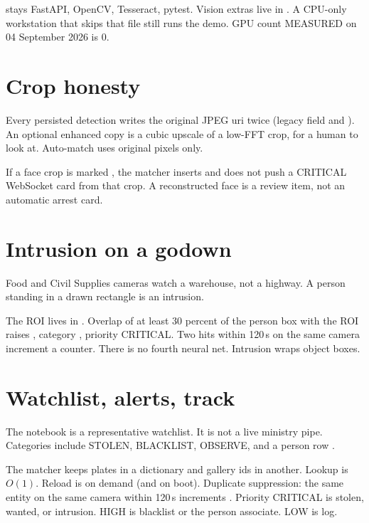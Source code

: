 \documentclass[listings]{csf301-notes}
\begin{document}
\begin{implnote}
 stays FastAPI, OpenCV, Tesseract, pytest. Vision extras live in . A CPU-only workstation that skips that file still runs the demo. GPU count MEASURED on 04 September 2026 is 0.
\end{implnote}

\section{Crop honesty}
Every persisted detection writes the original JPEG uri twice (legacy field and ). An optional enhanced copy is a cubic upscale of a low-FFT crop, for a human to look at. Auto-match uses original pixels only.

If a face crop is marked , the matcher inserts  and does not push a CRITICAL WebSocket card from that crop. A reconstructed face is a review item, not an automatic arrest card.

\section{Intrusion on a godown}
Food and Civil Supplies cameras watch a warehouse, not a highway. A person standing in a drawn rectangle is an intrusion.

The ROI lives in . Overlap of at least 30 percent of the person box with the ROI raises , category , priority CRITICAL. Two hits within 120\,s on the same camera increment a counter. There is no fourth neural net. Intrusion wraps object boxes.

\section{Watchlist, alerts, track}
The notebook is a representative watchlist. It is not a live ministry pipe. Categories include STOLEN, BLACKLIST, OBSERVE, and a person row .

The matcher keeps plates in a dictionary and gallery ids in another. Lookup is $O(1)$. Reload is on demand (and on boot). Duplicate suppression: the same entity on the same camera within 120\,s increments . Priority CRITICAL is stolen, wanted, or intrusion. HIGH is blacklist or the person associate. LOW is log.
\end{document}
